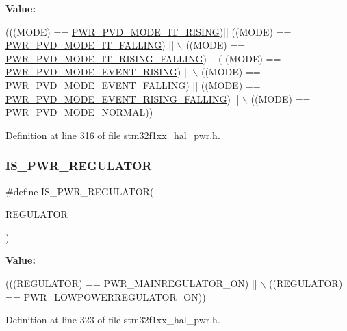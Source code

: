 {\bfseries Value\+:}
\begin{DoxyCode}
(((MODE) == \hyperlink{group___p_w_r___p_v_d___mode_ga102d7b8354419990a2a780f61cd020a6}{PWR\_PVD\_MODE\_IT\_RISING})|| ((MODE) == 
      \hyperlink{group___p_w_r___p_v_d___mode_gab600a54f3a588de836cfe4b727ab8a53}{PWR\_PVD\_MODE\_IT\_FALLING}) || \(\backslash\)
                              ((MODE) == \hyperlink{group___p_w_r___p_v_d___mode_gac531fbf14457e6595505354fad521b67}{PWR\_PVD\_MODE\_IT\_RISING\_FALLING}) || (
      (MODE) == \hyperlink{group___p_w_r___p_v_d___mode_ga1a946b01887aa886de329a92c3ab0dd4}{PWR\_PVD\_MODE\_EVENT\_RISING}) || \(\backslash\)
                              ((MODE) == \hyperlink{group___p_w_r___p_v_d___mode_gaaedbe45f1a1ea6c30af6ac51abae0cae}{PWR\_PVD\_MODE\_EVENT\_FALLING}) || ((MODE) 
      == \hyperlink{group___p_w_r___p_v_d___mode_ga7455387c8e9049f9f66b46423d4f4091}{PWR\_PVD\_MODE\_EVENT\_RISING\_FALLING}) || \(\backslash\)
                              ((MODE) == \hyperlink{group___p_w_r___p_v_d___mode_ga3a4bf701a36a14a4edf4dc5a28153277}{PWR\_PVD\_MODE\_NORMAL}))
\end{DoxyCode}


Definition at line 316 of file stm32f1xx\+\_\+hal\+\_\+pwr.\+h.

\mbox{\label{group___p_w_r___private___macros_ga03c105070272141c0bab5f2b74469072}} 
\subsubsection{\texorpdfstring{I\+S\+\_\+\+P\+W\+R\+\_\+\+R\+E\+G\+U\+L\+A\+T\+OR}{IS\_PWR\_REGULATOR}}
{\footnotesize\ttfamily \#define I\+S\+\_\+\+P\+W\+R\+\_\+\+R\+E\+G\+U\+L\+A\+T\+OR(\begin{DoxyParamCaption}\item[{}]{R\+E\+G\+U\+L\+A\+T\+OR }\end{DoxyParamCaption})}

{\bfseries Value\+:}
\begin{DoxyCode}
(((REGULATOR) == PWR\_MAINREGULATOR\_ON) || \(\backslash\)
                                     ((REGULATOR) == PWR\_LOWPOWERREGULATOR\_ON))
\end{DoxyCode}


Definition at line 323 of file stm32f1xx\+\_\+hal\+\_\+pwr.\+h.

